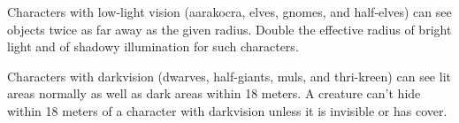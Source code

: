 Characters with low-light vision (aarakocra, elves, gnomes, and half-elves) can see objects twice as far away as the given radius. Double the effective radius of bright light and of shadowy illumination for such characters.

Characters with darkvision (dwarves, half-giants, muls, and thri-kreen) can see lit areas normally as well as dark areas within 18 meters. A creature can't hide within 18 meters of a character with darkvision unless it is invisible or has cover.